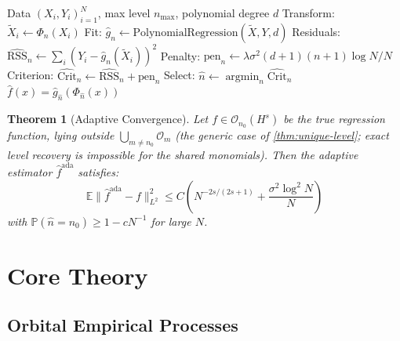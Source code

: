 \documentclass[11pt,twoside,openright]{book}
\theoremstyle{plain}
\newtheorem{theorem}{Theorem}[chapter]
\theoremstyle{definition}
\theoremstyle{remark}
\newcommand{\calO}{\mathcal{O}}
\newcommand{\norm}[1]{\|#1\|}
\newcommand{\E}{\mathbb{E}}
\newcommand{\Prob}{\mathbb{P}}
\DeclareMathOperator{\argmin}{argmin}
\begin{document}
\begin{algorithm}[H]
\caption{Adaptive Orbital Estimation}
\label{alg:adaptive-orbital}
\begin{algorithmic}[1]
\REQUIRE Data $(X_i, Y_i)_{i=1}^N$, max level $n_{\max}$, polynomial degree $d$
    \STATE Transform: $\tilde{X}_i \gets \Phi_n(X_i)$
    \STATE Fit: $\hat{g}_n \gets \text{PolynomialRegression}(\tilde{X}, Y, d)$
    \STATE Residuals: $\widehat{\text{RSS}}_n \gets \sum_i (Y_i - \hat{g}_n(\tilde{X}_i))^2$
    \STATE Penalty: $\text{pen}_n \gets \lambda \sigma^2 (d+1)(n+1) \log N / N$
    \STATE Criterion: $\widehat{\text{Crit}}_n \gets \widehat{\text{RSS}}_n + \text{pen}_n$
\ENDFOR
\STATE Select: $\hat{n} \gets \argmin_n \widehat{\text{Crit}}_n$
\RETURN $\hat{f}(x) = \hat{g}_{\hat{n}}(\Phi_{\hat{n}}(x))$
\end{algorithmic}
\end{algorithm}

\begin{theorem}[Adaptive Convergence]
\label{thm:adaptive}
Let $f \in \calO_{n_0}(H^s)$ be the true regression function, lying outside $\bigcup_{m\neq n_0}\calO_m$ (the generic case of \cref{thm:unique-level}; exact level recovery is impossible for the shared monomials). Then the adaptive estimator $\hat{f}^{\text{ada}}$ satisfies:
\begin{equation}
\E\norm{\hat{f}^{\text{ada}} - f}_{L^2}^2 \leq C\left(N^{-2s/(2s+1)} + \frac{\sigma^2 \log^2 N}{N}\right)
\label{eq:adaptive-rate}
\end{equation}
with $\Prob(\hat{n} = n_0) \geq 1 - c N^{-1}$ for large $N$.
\end{theorem}


\part{Core Theory}
\label{part:core}


\chapter{Orbital Empirical Processes}
\label{ch:empirical}
\end{document}
